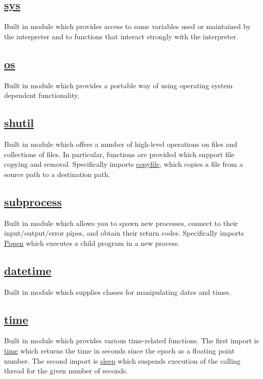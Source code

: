 \documentclass[12pt]{article}
\begin{document}
\subsection*{\href{https://docs.python.org/3/library/sys.html}{sys}}
Built in module which provides access to some variables used or maintained by the interpreter and to functions that interact strongly with the interpreter.

\subsection*{\href{https://docs.python.org/3/library/os.html}{os}}
Built in module which provides a portable way of using operating system dependent functionality.

\subsection*{\href{https://docs.python.org/3/library/shutil.html}{shutil}}
Built in module which offers a number of high-level operations on files and collections of files. In particular, functions are provided which support file copying and removal. Specifically imports \href{https://docs.python.org/3/library/shutil.html?highlight=copyfile#shutil.copyfile}{copyfile}, which copies a file from a source path to a destination path. 

\subsection*{\href{https://docs.python.org/3/library/subprocess.html}{subprocess}}
Built in module which allows you to spawn new processes, connect to their input/output/error pipes, and obtain their return codes. Specifically imports \href{https://docs.python.org/3/library/subprocess.html?highlight=popen\#subprocess.Popen}{Popen} which executes a child program in a new process.

\subsection*{\href{https://docs.python.org/3/library/datetime.html}{datetime}}
Built in module which supplies classes for manipulating dates and times.

\subsection*{\href{https://docs.python.org/3/library/time.html}{time}}
Built in module which provides various time-related functions. The first import is \href{https://docs.python.org/3/library/time.html#time.time}{time} which returns the time in seconds since the epoch as a floating point number. The second import is \href{https://docs.python.org/3/library/time.html#time.sleep}{sleep} which suspends execution of the calling thread for the given number of seconds. 
\end{document}
